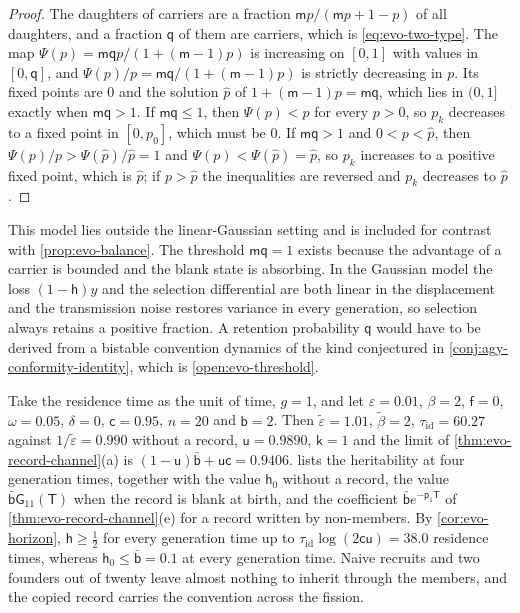\begin{proof}
The daughters of carriers are a fraction $\mathsf mp/(\mathsf mp+1-p)$ of all daughters, and a fraction $\mathsf q$ of them are carriers, which is \eqref{eq:evo-two-type}. The map $\Psi(p)=\mathsf m\mathsf qp/(1+(\mathsf m-1)p)$ is increasing on $[0,1]$ with values in $[0,\mathsf q]$, and $\Psi(p)/p=\mathsf m\mathsf q/(1+(\mathsf m-1)p)$ is strictly decreasing in $p$. Its fixed points are $0$ and the solution $\hat p$ of $1+(\mathsf m-1)p=\mathsf m\mathsf q$, which lies in $(0,1]$ exactly when $\mathsf m\mathsf q>1$. If $\mathsf m\mathsf q\le1$, then $\Psi(p)<p$ for every $p>0$, so $p_k$ decreases to a fixed point in $[0,p_0]$, which must be $0$. If $\mathsf m\mathsf q>1$ and $0<p<\hat p$, then $\Psi(p)/p>\Psi(\hat p)/\hat p=1$ and $\Psi(p)<\Psi(\hat p)=\hat p$, so $p_k$ increases to a positive fixed point, which is $\hat p$; if $p>\hat p$ the inequalities are reversed and $p_k$ decreases to $\hat p$.
\end{proof}

This model lies outside the linear-Gaussian setting and is included for contrast with \cref{prop:evo-balance}. The threshold $\mathsf m\mathsf q=1$ exists because the advantage of a carrier is bounded and the blank state is absorbing. In the Gaussian model the loss $(1-\mathsf h)y$ and the selection differential are both linear in the displacement and the transmission noise restores variance in every generation, so selection always retains a positive fraction. A retention probability $\mathsf q$ would have to be derived from a bistable convention dynamics of the kind conjectured in \cref{conj:agy-conformity-identity}, which is \cref{open:evo-threshold}.

\begin{example}\label{ex:evo-worked}
Take the residence time as the unit of time, $g=1$, and let $\varepsilon=0.01$, $\beta=2$, $\mathsf f=0$, $\omega=0.05$, $\delta=0$, $\mathsf c=0.95$, $n=20$ and $\mathsf b=2$. Then $\tilde\varepsilon=1.01$, $\tilde\beta=2$, $\tau_{\mathrm{id}}=60.27$ against $1/\tilde\varepsilon=0.990$ without a record, $\mathsf u=0.9890$, $\mathsf k=1$ and the limit of \cref{thm:evo-record-channel}(a) is $(1-\mathsf u)\bar{\mathsf b}+\mathsf u\mathsf c=0.9406$.  lists the heritability at four generation times, together with the value $\mathsf h_0$ without a record, the value $\bar{\mathsf b}\mathsf G_{11}(\mathsf T)$ when the record is blank at birth, and the coefficient $\bar{\mathsf b}e^{-\mathsf p_1\mathsf T}$ of \cref{thm:evo-record-channel}(e) for a record written by non-members. By \cref{cor:evo-horizon}, $\mathsf h\ge\frac12$ for every generation time up to $\tau_{\mathrm{id}}\log(2\mathsf c\mathsf u)=38.0$ residence times, whereas $\mathsf h_0\le\bar{\mathsf b}=0.1$ at every generation time. Naive recruits and two founders out of twenty leave almost nothing to inherit through the members, and the copied record carries the convention across the fission.
\end{example}


